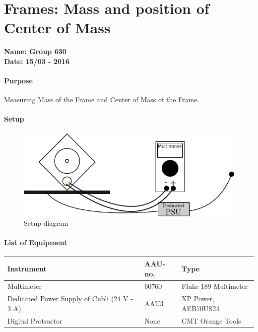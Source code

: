 \chapter{Frames: Mass and position of Center of Mass }\label{MassFrameCenterOfMass} 
\textbf{Name: Group 630}\\
\textbf{Date: 15/03 - 2016}

\subsubsection{Purpose}
Measuring Mass of the Frame and Center of Mass of the Frame.

\subsubsection{Setup}
\begin{figure}[H]
	\centering
	\includegraphics[scale=1]{figures/LabSetupLinearityTest.pdf}
	\caption{Setup diagram}
	\label{LabSetupRangeTest}
\end{figure}\vspace{-5mm}

\subsubsection{List of Equipment}
\begin{table}[H]
	\begin{tabular}{|l|l|p{4.3cm}|}
		\hline%
		\textbf{Instrument}                                  &  \textbf{AAU-no.}  &  \textbf{Type}                       \\
		\hline%
		Multimeter                                           &  60760           &  Fluke 189 Multimeter		                   \\
		\hline%
		Dedicated Power Supply of Cubli \small{(24 V - 3 A)} &  AAU3                   &  XP Power, AEB70US24                 \\
		\hline%
		Digital Protractor                                   &  None               & CMT Orange Tools     \\
		\hline%
	\end{tabular}
\end{table}

